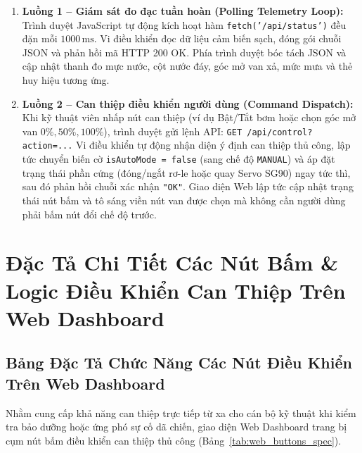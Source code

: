 \begin{enumerate}
    \item \textbf{Luồng 1 -- Giám sát đo đạc tuần hoàn (Polling Telemetry Loop):} Trình duyệt JavaScript tự động kích hoạt hàm \texttt{fetch('/api/status')} đều đặn mỗi $1000\,\text{ms}$. Vi điều khiển đọc dữ liệu cảm biến sạch, đóng gói chuỗi JSON và phản hồi mã HTTP 200 OK. Phía trình duyệt bóc tách JSON và cập nhật thanh đo mực nước, cột nước đáy, góc mở van xả, mức mưa và thẻ huy hiệu tương ứng.
    \item \textbf{Luồng 2 -- Can thiệp điều khiển người dùng (Command Dispatch):} Khi kỹ thuật viên nhấp nút can thiệp (ví dụ Bật/Tắt bơm hoặc chọn góc mở van $0\%, 50\%, 100\%$), trình duyệt gửi lệnh API:
    \newline
    \texttt{GET /api/control?action=...}
    \newline
    Vi điều khiển tự động nhận diện ý định can thiệp thủ công, lập tức chuyển biến cờ \texttt{isAutoMode = false} (sang chế độ \texttt{MANUAL}) và áp đặt trạng thái phần cứng (đóng/ngắt rơ-le hoặc quay Servo SG90) ngay tức thì, sau đó phản hồi chuỗi xác nhận \texttt{"OK"}. Giao diện Web lập tức cập nhật trạng thái nút bấm và tô sáng viền nút van được chọn mà không cần người dùng phải bấm nút đổi chế độ trước.
\end{enumerate}

\section{Đặc Tả Chi Tiết Các Nút Bấm \& Logic Điều Khiển Can Thiệp Trên Web Dashboard}

\subsection{Bảng Đặc Tả Chức Năng Các Nút Điều Khiển Trên Web Dashboard}

Nhằm cung cấp khả năng can thiệp trực tiếp từ xa cho cán bộ kỹ thuật khi kiểm tra bảo dưỡng hoặc ứng phó sự cố dã chiến, giao diện Web Dashboard trang bị cụm nút bấm điều khiển can thiệp thủ công (Bảng~\ref{tab:web_buttons_spec}).

